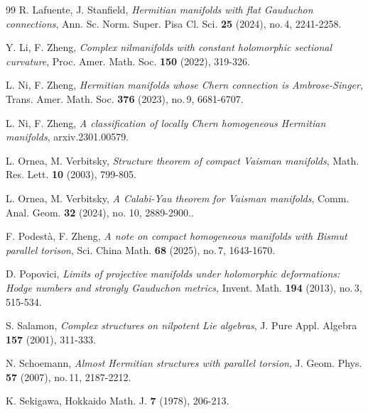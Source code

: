 \documentclass{amsart}
\numberwithin{equation}{section}
\theoremstyle{definition}
\renewcommand{\1}{\mathds{1}}
\renewcommand{\>}{\rightarrow}
\begin{document}
\begin{thebibliography}{99}
 R. Lafuente, J. Stanfield,
\newblock \textit{Hermitian manifolds with flat Gauduchon connections},
\newblock Ann. Sc. Norm. Super. Pisa Cl. Sci. \textbf{25} (2024), no.\,4, 2241-2258.


 Y. Li, F. Zheng,
\newblock \textit{Complex nilmanifolds with constant holomorphic sectional curvature},
\newblock Proc. Amer. Math. Soc. \textbf{150} (2022), 319-326.



 L. Ni, F. Zheng,
\newblock \textit{Hermitian manifolds whose Chern connection is Ambrose-Singer},
\newblock Trans. Amer. Math. Soc. \textbf{376} (2023), no.\,9, 6681-6707.

 L. Ni, F. Zheng,
\newblock \textit{A classification of locally Chern homogeneous Hermitian manifolds},
\newblock arxiv.2301.00579.

 L. Ornea, M. Verbitsky,
\newblock \textit{Structure theorem of compact Vaisman manifolds},
\newblock Math. Res. Lett. \textbf{10} (2003), 799-805.

 L. Ornea, M. Verbitsky,
\newblock \textit{A Calabi-Yau theorem for Vaisman manifolds},
\newblock Comm. Anal. Geom. \textbf{32} (2024), no. 10, 2889-2900..

 F. Podest\`a, F. Zheng,
\newblock \textit{A note on compact homogeneous manifolds with Bismut parallel torison},
\newblock Sci. China Math. \textbf{68} (2025), no.\,7, 1643-1670.

 D. Popovici,
\newblock \textit{Limits of projective manifolds under holomorphic deformations: Hodge numbers and strongly Gauduchon metrics,}
\newblock Invent. Math. {\bf 194} (2013), no.\,3, 515-534.

 S. Salamon,
\newblock \textit{Complex structures on nilpotent Lie algebras},
\newblock J. Pure Appl. Algebra \textbf{157} (2001), 311-333.


 N. Schoemann,
\newblock \textit{Almost Hermitian structures with parallel torsion},
\newblock J. Geom. Phys. {\bf 57} (2007), no.\,11, 2187-2212.

 K. Sekigawa,
\newblock Hokkaido Math. J. {\bf 7} (1978), 206-213.


\end{thebibliography}
\end{document}
